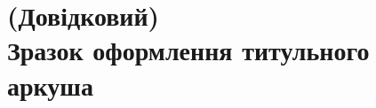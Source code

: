\chapter[(Довідковий) Зразок оформлення титульного аркуша]{(Довідковий)\\ Зразок оформлення титульного аркуша}\label{apdx:title}

